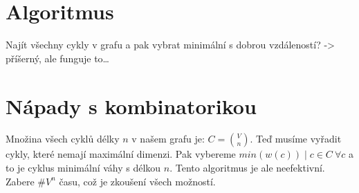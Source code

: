 \section{Algoritmus}

Najít všechny cykly v grafu a pak vybrat minimální s dobrou vzdáleností? -> příšerný, ale funguje to\dots

\section{Nápady s kombinatorikou}
Množina všech cyklů délky $n$ v našem grafu je: $C=\binom{V}{n}$. Teď musíme vyřadit cykly, které nemají maximální dimenzi. Pak vybereme $min(w(c)) \mid c \in C~\forall c$ a to je cyklus minimální váhy s délkou $n$. Tento algoritmus je ale neefektivní. Zabere $\#V^n$ času, což je zkoušení všech možností.